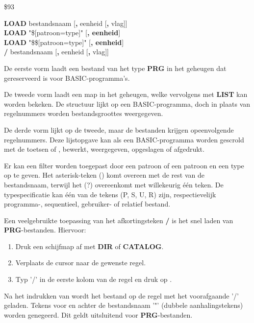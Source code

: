 \begin{description}[leftmargin=2cm,style=nextline]
\item [Token:]    \$93

\item [Formaat:]   {\bf LOAD} bestandsnaam [{\bf,} eenheid [{\bf,} vlag]] \\               {\bf LOAD} "\$[patroon=type]" [{\bf, eenheid}] \\                  {\bf LOAD} "\$\$[patroon=type]" [{\bf, eenheid}] \\                  {\bf /} bestandsnaam [{\bf,} eenheid [{\bf,} vlag]]

\item [Gebruik:]    De eerste vorm laadt een bestand van het type {\bf PRG} in het geheugen dat gereserveerd is voor BASIC-programma's.

De tweede vorm laadt een map in het geheugen, welke vervolgens met {\bf LIST} kan worden bekeken. De structuur lijkt op een BASIC-programma, doch in plaats van regelnummers worden bestandsgroottes weergegeven.

                  De derde vorm lijkt op de tweede, maar de bestanden krijgen opeenvolgende regelnummers. Deze lijstopgave kan als een BASIC-programma worden gescrold met de toetsen  of , bewerkt, weergegeven, opgeslagen of afgedrukt.

                  Er kan een filter worden toegepast door een patroon of een patroon en een type op te geven. Het asterisk-teken ({\bf *}) komt overeen met de rest van de bestandsnaam, terwijl het \screentext(?) overeenkomt met willekeurig één teken. De typespecificatie kan één van de tekens (P, S, U, R) zijn, respectievelijk programma-, sequentieel, gebruiker- of relatief bestand.

                  Een veelgebruikte toepassing van het afkortingsteken {\bf /} is het snel laden van {\bf PRG}-bestanden. Hiervoor:

                  \begin{enumerate}
\item Druk een schijfmap af met {\bf DIR} of {\bf CATALOG}.                     \item Verplaats de cursor naar de gewenste regel.                     \item Typ '/' in de eerste kolom van de regel en druk op .
                  \end{enumerate}

                  Na het indrukken van  wordt het bestand op de regel met het voorafgaande '/' geladen. Tekens voor en achter de bestandsnaam '"' (dubbele aanhalingstekens) worden genegeerd. Dit geldt uitsluitend voor {\bf PRG}-bestanden.


\end{description}
